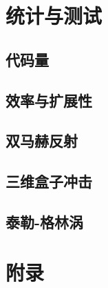 \documentclass[UTF8,zihao=5]{ctexart} %
\begin{document}
\section{统计与测试}

\subsection{代码量}

\subsection{效率与扩展性}

\subsection{双马赫反射}

\subsection{三维盒子冲击}

\subsection{泰勒-格林涡}

\section*{附录}

{}
























\end{document}
